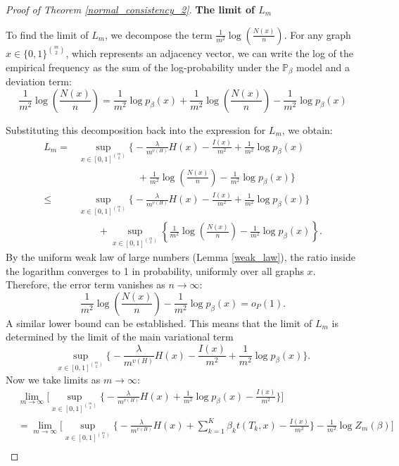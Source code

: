 \documentclass[12pt]{article}
\numberwithin{equation}{section}
\begin{document}
\begin{proof}[Proof of Theorem \ref{normal_consistency_2}]
\textbf{The limit of $L_m$}

\medskip

To find the limit of $L_m$, we decompose the term $\frac{1}{m^2}\log\left(\frac{N(x)}{n}\right)$.
For any graph $x \in \{0,1\}^{\binom{m}{2}}$, which represents an adjacency vector, we can write the log of the empirical frequency as the sum of the log-probability under the $\mathbb{P}_{\beta}$ model and a deviation term:
\[
\frac{1}{m^2}\log\left(\frac{N(x)}{n}\right) = \frac{1}{m^2}\log p_{\beta}(x) + \frac{1}{m^2}\log\left(\frac{N(x)}{n}\right) - \frac{1}{m^2}\log p_{\beta}(x)
\]

Substituting this decomposition back into the expression for $L_m$, we obtain:
\begin{align*}
L_m =& \sup_{x\in[0,1]^{\binom{m}{2}}}\Biggl\{-\frac{\lambda}{m^{v(H)}}H(x) - \frac{I(x)}{m^2} + \frac{1}{m^2}\log p_{\beta}(x)  \\
& \qquad\qquad\qquad + \frac{1}{m^2}\log\left(\frac{N(x)}{n}\right) - \frac{1}{m^2}\log p_{\beta}(x)
 \Biggr\}\\
\le & \sup_{x\in[0,1]^{\binom{m}{2}}}\Biggl\{-\frac{\lambda}{m^{v(H)}}H(x) - \frac{I(x)}{m^2} + \frac{1}{m^2}\log p_{\beta}(x)\Biggr\} \\
& \qquad + \sup_{x\in[0,1]^{\binom{m}{2}}} \left\{ \frac{1}{m^2}\log\left(\frac{N(x)}{n}\right) - \frac{1}{m^2}\log p_{\beta}(x)
 \right\}.
\end{align*}
By the uniform weak law of large numbers (Lemma \ref{weak_law}), the ratio inside the logarithm converges to 1 in probability, uniformly over all graphs $x$. Therefore, the error term vanishes as $n \to \infty$:
\[
\frac{1}{m^2}\log\left(\frac{N(x)}{n}\right) - \frac{1}{m^2}\log p_{\beta}(x)
= o_P(1).
\]
A similar lower bound can be established. This means that the limit of $L_m$ is determined by the limit of the main variational term
$$\sup_{x\in[0,1]^{\binom{m}{2}}}\Biggl\{-\frac{\lambda}{m^{v(H)}}H(x) - \frac{I(x)}{m^2} + \frac{1}{m^2}\log p_{\beta}(x)\Biggr\}.$$
Now we take limits as \(m\rightarrow\infty\):
\begin{align*}
&\lim_{m\to\infty} \Biggl[  \sup_{x\in[0,1]^{\binom{m}{2}}}\Biggl\{-\frac{\lambda}{m^{v(H)}}H(x) + \frac{1}{m^2}\log p_{\beta}(x) - \frac{I(x)}{m^2}\Biggr\} \Biggr] \\
&= \lim_{m\to\infty} \Biggl[  \sup_{x\in[0,1]^{\binom{m}{2}}}\Biggl\{-\frac{\lambda}{m^{v(H)}}H(x) + \sum_{k=1}^{K}\beta_k t(T_k,x) - \frac{I(x)}{m^2}\Biggr\}  - \frac{1}{m^2}\log Z_m(\beta)\Biggr] \\

\end{align*}
\end{proof}
\end{document}
